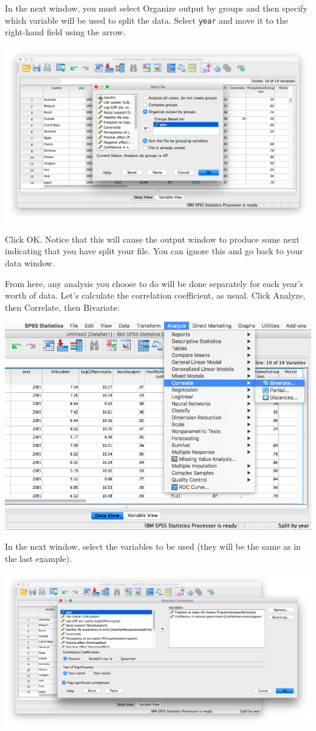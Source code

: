 \documentclass[
]{book}
\begin{document}
In the next window, you must select {Organize output by groups} and then specify which variable will be used to split the data. Select \texttt{year} and move it to the right-hand field using the arrow.

\includegraphics{img/3.4.31.png}

Click {OK}. Notice that this will cause the output window to produce some next indicating that you have split your file. You can ignore this and go back to your data window.

From here, any analysis you choose to do will be done separately for each year's worth of data. Let's calculate the correlation coefficient, as usual. Click {Analyze}, then {Correlate}, then {Bivariate}:

\includegraphics{img/3.4.32.png}

In the next window, select the variables to be used (they will be the same as in the last example).

\includegraphics{img/3.4.33.png}
\end{document}
